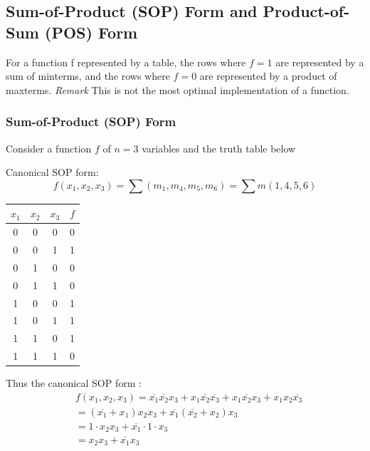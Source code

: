 \documentclass[12pt,openany, tikz,border=10pt]{book}
\begin{document}
    \newpage
\subsection{Sum-of-Product (SOP) Form and Product-of-Sum (POS) Form}
For a function f represented by a table, the rows where $f=1$ are represented by a sum of minterms, and the rows where $f=0$ are represented by a product of maxterms. \newline
\textit{Remark} This is not the most optimal implementation of a function. \newline

\subsubsection{Sum-of-Product (SOP) Form}
\vspace*{10px}
Consider a function \( f \) of \( n = 3 \) variables and the truth table below

Canonical SOP form:
\[
f(x_1, x_2, x_3) = \sum (m_1, m_4, m_5, m_6) = \sum m(1, 4, 5, 6)
\]

\begin{center}
    \begin{tabular}{|c|c|c|c|}
        \hline
        \( x_1 \) & \( x_2 \) & \( x_3 \) & \( f \) \\
        \hline
        0 & 0 & 0 & 0 \\
        \hline
        \rowcolor{blue!25}
        0 & 0 & 1 & 1 \\
        \hline
        0 & 1 & 0 & 0 \\
        \hline
        0 & 1 & 1 & 0 \\
        \hline
        \rowcolor{blue!25}
        1 & 0 & 0 & 1 \\
        \hline
        \rowcolor{blue!25}
        1 & 0 & 1 & 1 \\
        \hline
        \rowcolor{blue!25}
        1 & 1 & 0 & 1 \\
        \hline
        1 & 1 & 1 & 0 \\
        \hline
    \end{tabular}
\end{center}

Thus the canonical SOP form :
\begin{align*}
    &f(x_1, x_2, x_3) = \overline{x_1} \overline{x_2} x_3 + x_1 \overline{x_2} \overline{x_3} + x_1 \overline{x_2} x_3 + x_1 x_2 \overline{x_3} \\
    &= (\overline{x_1} + x_1) x_2 x_3 + \overline{x_1} (\overline{x_2} + x_2) x_3 \\
    &= 1 \cdot x_2 x_3 + \overline{x_1} \cdot 1 \cdot x_3 \\
    &= x_2 x_3 + \overline{x_1} x_3
    \end{align*}
\end{document}
